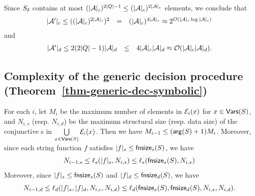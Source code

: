 Since $S_{\delta}$ contains at most $(|\mathcal{A}|_c)^{2 |Q|-1} \le (|\mathcal{A}|_c)^{2 |\mathcal{A}|_c}$ elements, we conclude that 
$$
\begin{array}{l c l}
|\mathcal{A}'|_c \le ((|\mathcal{A}|_c)^{2|\mathcal{A}|_c})^2  & = & (|\mathcal{A}|_c)^{4|\mathcal{A}|_c} 
 \approx    2^{\mathcal{O}\left(|\mathcal{A}|_c \log |\mathcal{A}|_c\right)}
\end{array}
$$ 
and 
$$
\begin{array}{l c l}
|\mathcal{A}'|_d \le 2(2|Q|-1) |\mathcal{A}|_d & \le & 4 |\mathcal{A}|_c |\mathcal{A}|_d 
\approx   \mathcal{O}( |\mathcal{A}|_c |\mathcal{A}|_d).
\end{array}
$$





\subsection{Complexity of the generic decision procedure (Theorem~\ref{thm-generic-dec-symbolic})}

For each $i$, let $M_i$ be the maximum number of elements in $\mathcal{E}_i(x)$ for $x  \in \mathsf{Vars}(S)$,
and $N_{i,s}$ (resp. $N_{i, d}$) be the maximum structural size (resp. data size) of the conjunctive \SA{}s in $\bigcup \limits_{x \in \mathsf{Vars}(S)} \mathcal{E}_i(x)$. Then we have $M_{i-1} \le (\mathsf{arg}(S)+1)M_i $. Moreover, since each string function $f$ satisfies  $|f|_s \le \mathsf{fnsize}_s(S)$, we have 
%
$$N_{i-1, s} \le \ell_s(|f|_s, N_{i, s}) \le \ell_s(\mathsf{fnsize}_s(S), N_{i,s})$$ 
%
Moreover, since $|f|_s \le \mathsf{fnsize}_s(S)$ and $|f|_d \le \mathsf{fnsize}_d(S)$, we have
%
$$N_{i-1, d} \le \ell_d(|f|_s, |f|_d, N_{i, c}, N_{i,d}) \le \ell_d(\mathsf{fnsize}_s(S), \mathsf{fnsize}_d(S), N_{i, s}, N_{i,d}).$$ 


